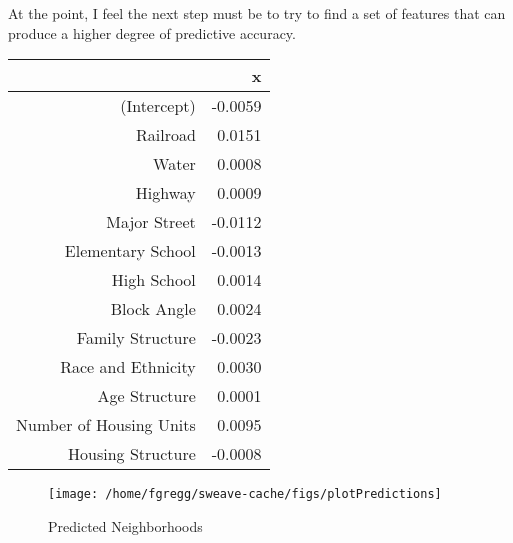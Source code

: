 \documentclass[12pt,letter]{article}\usepackage[]{graphicx}\usepackage[]{color}
\makeatletter
\def\maxwidth{ %
  \ifdim\Gin@nat@width>\linewidth
    \linewidth
  \else
    \Gin@nat@width
  \fi
}
\newenvironment{knitrout}{}{} %
\makeatother
\begin{document}
At the point, I feel the
next step must be to try to find a set of features that can produce a
higher degree of predictive accuracy.





\begin{table}[ht]
\centering
\begin{tabular}{rr}
  \hline
 & x \\ 
  \hline
(Intercept) & -0.0059 \\ 
  Railroad & 0.0151 \\ 
  Water & 0.0008 \\ 
  Highway & 0.0009 \\ 
  Major Street & -0.0112 \\ 
  Elementary School & -0.0013 \\ 
  High School & 0.0014 \\ 
  Block Angle & 0.0024 \\ 
  Family Structure & -0.0023 \\ 
  Race and Ethnicity & 0.0030 \\ 
  Age Structure & 0.0001 \\ 
  Number of Housing Units & 0.0095 \\ 
  Housing Structure & -0.0008 \\ 
   \hline
\end{tabular}
\end{table}




\begin{figure}
\begin{knitrout}
\color{fgcolor}

{\centering \texttt{[image: /home/fgregg/sweave-cache/figs/plotPredictions]} 

}



\end{knitrout}

\caption{Predicted Neighborhoods}
\end{figure}



\end{document}

